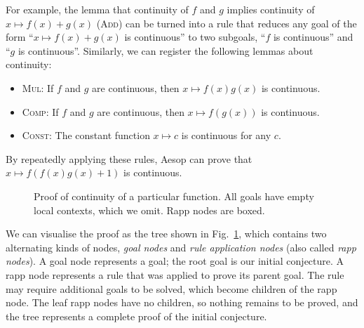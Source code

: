 For example, the lemma that continuity of $f$ and $g$ implies continuity of $x ↦ f(x) + g(x)$ (\textsc{Add}) can be turned into a rule that reduces any goal of the form \enquote{$x ↦ f(x) + g(x)$ is continuous} to two subgoals, \enquote{$f$ is continuous} and \enquote{$g$ is continuous}.
Similarly, we can register the following lemmas about continuity:
\begin{itemize}
  \item \textsc{Mul}: If $f$ and $g$ are continuous, then $x ↦ f(x)g(x)$ is continuous.
  \item \textsc{Comp}: If $f$ and $g$ are continuous, then $x ↦ f(g(x))$ is continuous.
  \item \textsc{Const}: The constant function $x ↦ c$ is continuous for any $c$.
\end{itemize}
By repeatedly applying these rules, Aesop can prove that $x ↦ f(f(x)g(x) + 1)$ is continuous.

\begin{figure}
  \centering
  \caption{Proof of continuity of a particular function.
  All goals have empty local contexts, which we omit.
  Rapp nodes are boxed.}%
  \label{fig:intro:proof-tree}
\end{figure}

We can visualise the proof as the tree shown in Fig.~\ref{fig:intro:proof-tree}, which contains two alternating kinds of nodes, \emph{goal nodes} and \emph{rule application nodes} (also called \emph{rapp nodes}).
A goal node represents a goal; the root goal is our initial conjecture.
A rapp node represents a rule that was applied to prove its parent goal.
The rule may require additional goals to be solved, which become children of the rapp node.
The leaf rapp nodes have no children, so nothing remains to be proved, and the tree represents a complete proof of the initial conjecture.

